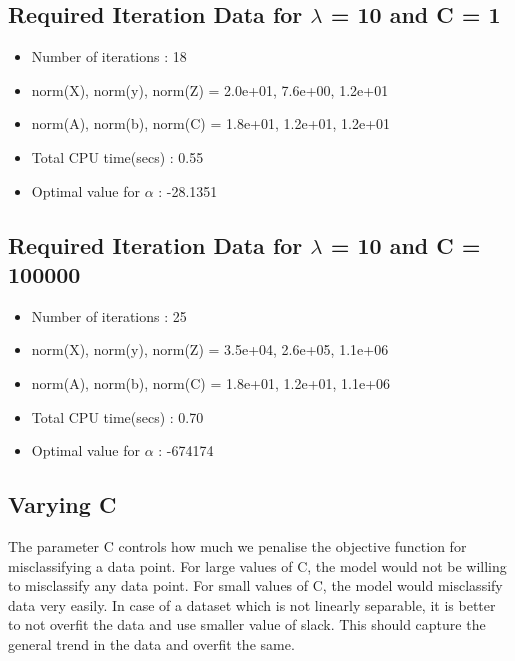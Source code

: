 \documentclass[english]{article}
\begin{document}
 \subsection{Required Iteration Data for $\lambda$ = 10 and C = 1}
\begin{itemize}
	\item Number of iterations : 18
	\item  norm(X), norm(y), norm(Z) = 2.0e+01, 7.6e+00, 1.2e+01
 	\item norm(A), norm(b), norm(C) = 1.8e+01, 1.2e+01, 1.2e+01
 	\item Total CPU time(secs) : 0.55 
 	\item Optimal value for $\alpha$ : -28.1351
 \end{itemize}

  \subsection{Required Iteration Data for $\lambda$ = 10 and C = 100000}
\begin{itemize}
	\item Number of iterations : 25
	\item  norm(X), norm(y), norm(Z) = 3.5e+04, 2.6e+05, 1.1e+06
 	\item  norm(A), norm(b), norm(C) = 1.8e+01, 1.2e+01, 1.1e+06
 	\item Total CPU time(secs) : 0.70
 	\item Optimal value for $\alpha$ : -674174
 \end{itemize}

\subsection{Varying C}
The parameter C controls how much we penalise the objective function for misclassifying a data point. For large values of C, the model would not be willing to misclassify any data point. For small values of C, the model would misclassify data very easily.
\newline
In case of a dataset which is not linearly separable, it is better to not overfit the data and use smaller value of slack. This should capture the general trend in the data and overfit the same.
\end{document}

